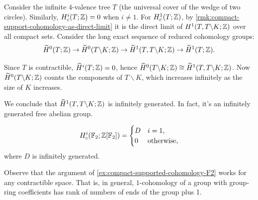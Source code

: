 \begin{example}
    \label{ex:compact-supported-cohomology-F2}
    Consider the infinite \(4\)-valence tree \(T\) (the universal cover of the wedge of two circles). Similarly, \(H^i_c(T;\mathbb{Z})=0\) when \(i\neq 1\). For \(H^1_c(T;\mathbb{Z})\), by \cref{rmk:compact-support-cohomology-as-direct-limit} it is the direct limit of \(H^1(T,T\backslash K;\mathbb{Z})\) over all compact sets. Consider the long exact sequence of reduced cohomology groups:
    \[
    \widetilde H^0(T;\mathbb{Z})  \to \widetilde H^0 (T\backslash K ; \mathbb{Z}) \to \widetilde H^1 (T,T\backslash K; \mathbb{Z}) \to \widetilde H^1 (T;\mathbb{Z}).
    \]

    Since \(T\) is contractible, \(\widetilde H^i(T;\mathbb{Z}) =0 \), hence \(\widetilde H^0 (T\backslash K ; \mathbb{Z}) \cong \widetilde H^1 (T,T\backslash K; \mathbb{Z})\). Now \(\widetilde H^0 (T\backslash K ; \mathbb{Z})\) counts the components of \(T\backslash K\), which increases infinitely as the size of \(K\) increases. 
    
    We conclude that  \(\widetilde H^1 (T,T\backslash K; \mathbb{Z})\) is infinitely generated. In fact, it's an infinitely generated free abelian group.
\end{example}

\begin{corollary}
    \begin{align*}
        H^i_c(\mathbb{F}_2;\mathbb{Z}[\mathbb{F}_2]) = \begin{cases}
            D & i=1,\\
            0 & \text{otherwise},
        \end{cases}
    \end{align*}
    where \(D\) is infinitely generated.
\end{corollary}

Observe that the argument of \cref{ex:compact-supported-cohomology-F2} works for any contractible space. That is, in general, \(1\)-cohomology of a group with group-ring coefficients has rank of numbers of ends of the group plus 1.